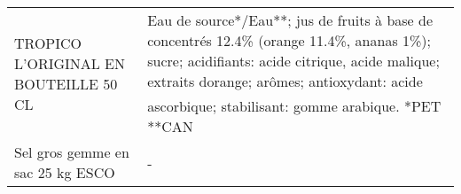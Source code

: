 \begin{longtable}{p{5cm}p{10cm}}
                                                                   TROPICO L'ORIGINAL EN BOUTEILLE 50 CL  &                                                                                                                                                                                                                                                                                                                                                                                                                                                                                                                                                                                                                                                                                                                                                                                         Eau de source*/Eau**; jus de fruits à base de concentrés 12.4\% (orange 11.4\%, ananas 1\%); sucre; acidifiants: acide citrique, acide malique; extraits dorange; arômes; antioxydant: acide ascorbique; stabilisant: gomme arabique.  *PET  **CAN \\
                                                                         Sel gros gemme en sac 25 kg ESCO &                                                                                                                                                                                                                                                                                                                                                                                                                                                                                                                                                                                                                                                                                                                                                                                                                                                                                                                                                                                                                                        - \\

\end{longtable}
